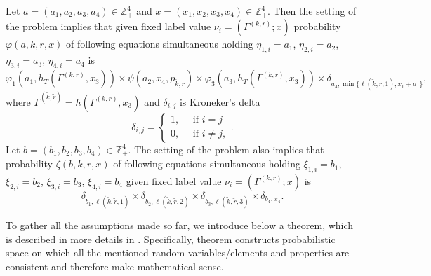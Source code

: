 \documentclass[10pt]{article}
\begin{document}
Let $a=(a_1, a_2, a_3, a_4) \in \mathbb{Z}_+^4$ and $x=(x_1, x_2, x_3, x_4) \in \mathbb{Z}_+^4$. Then the setting of the problem implies that given fixed label value $\nu_i=(\Gamma^{(k,r)}; x)$ probability $\varphi(a,k,r,x)$ of following equations simultaneous holding $\eta_{1,i}=a_1$, $\eta_{2,i}=a_2$, $\eta_{3,i}=a_3$, $\eta_{4,i}=a_4$ is
\begin{equation}
\varphi_1(a_1,h_T(\Gamma^{(k,r)},x_3)) \times \psi(a_2,x_4, p_{\tilde{k},\tilde{r}}) \times \varphi_3(a_3,h_T(\Gamma^{(k,r)},x_3))
\times \delta_{a_4,\min{\{\ell(\tilde{k},\tilde{r},1), x_1+a_1}\}},
\label{conditionProbOne}
\end{equation}
where $\Gamma^{(\tilde{k},\tilde{r})}=h(\Gamma^{(k,r)},x_3)$ and $\delta_{i,j}$ is Kroneker's delta
\begin{equation*}
\delta_{i,j}=\begin{cases} 1, \quad \text{ if }i=j\\0, \quad \text{ if } i\neq j,
\end{cases}.
\end{equation*}
Let $b=(b_1, b_2, b_3, b_4) \in \mathbb{Z}_+^4$. The setting of the problem also implies that probability $\zeta(b, k, r, x)$  of following equations simultaneous holding $\xi_{1,i}=b_1$, $\xi_{2,i}=b_2$, $\xi_{3,i}=b_3$, $\xi_{4,i}=b_4$ given fixed label value $\nu_i=(\Gamma^{(k,r)}; x)$ is
\begin{equation}
\delta_{b_1,\ell(\tilde{k},\tilde{r},1)} \times \delta_{b_2,\ell(\tilde{k},\tilde{r},2)} \times 
\delta_{b_3,\ell(\tilde{k},\tilde{r},3)} \times \delta_{b_4,x_4}.
\label{conditionProbTwo}
\end{equation}

To gather all the assumptions made so far, we introduce below a theorem, which is described in more details in \cite{k:z:02:2015}. Specifically, theorem constructs probabilistic space on which all the mentioned random variables/elements and properties are consistent and therefore make mathematical sense.
\end{document}
